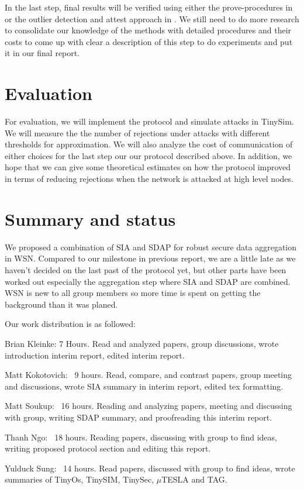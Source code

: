 \documentclass[a4paper]{article}
\begin{document}
In the last step, final results will be verified using either the
prove-procedures in \cite{SIA} or the outlier detection and attest approach in
\cite{SDAP}. We still need to do more research to consolidate our knowledge of
the methods with detailed procedures and their costs to come up with clear a
description of this step to do experiments and put it in our final report.

\section{Evaluation}
\label{sec:evaluation}

For evaluation, we will implement the protocol and simulate attacks in
TinySim. We will measure the the number of rejections under attacks with
different thresholds for approximation. We will also analyze the cost of
communication of either choices for the last step our our protocol described
above. In addition, we hope that we can give some theoretical estimates on how
the protocol improved in terms of reducing rejections when the network is
attacked at high level nodes.

\section{Summary and status}
\label{sec:summary}

We proposed a combination of SIA and SDAP for robust secure data aggregation
in WSN. Compared to our milestone in previous report, we are a little late as
we haven't decided on the last past of the protocol yet, but other parts have
been worked out especially the aggregation step where SIA and SDAP are
combined. WSN is new to all group members so more time is spent on getting the
background than it was planed.

Our work distribution is as followed:

Brian Kleinke: 7 Hours. Read and analyzed papers, group discussions, wrote
introduction interim report, edited interim report.

Matt Kokotovich: ~9 hours. Read, compare, and contrast papers, group meeting
and discussions, wrote SIA summary in interim report, edited tex formatting.

Matt Soukup: ~16 hours. Reading and analyzing papers, meeting and discussing
with group, writing SDAP summary, and proofreading this interim report.

Thanh Ngo: ~18 hours. Reading papers, discussing with group to find ideas,
writing proposed protocol section and editing this report.

Yulduck Sung: ~14 hours. Read papers, discussed with group to find ideas,
wrote summaries of TinyOs, TinySIM, TinySec, $\mu$TESLA and TAG.




\end{document}
